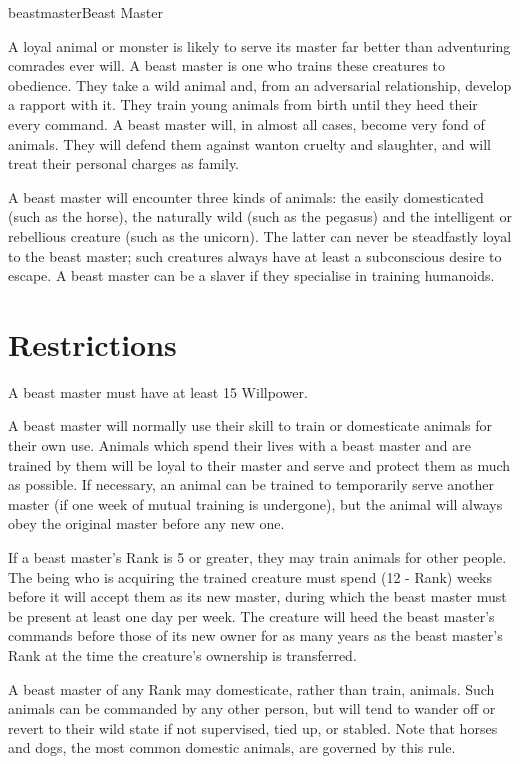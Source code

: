 \begin{Skill}[1.1]{beastmaster}{Beast Master}

A loyal animal or monster is likely to serve its master far better
than adventuring comrades ever will.  A beast master is one who trains
these creatures to obedience.  They take a wild animal and, from an
adversarial relationship, develop a rapport with it.  They train young
animals from birth until they heed their every command.  A beast
master will, in almost all cases, become very fond of animals.  They
will defend them against wanton cruelty and slaughter, and will treat
their personal charges as family.

A beast master will encounter three kinds of animals: the easily
domesticated (such as the horse), the naturally wild (such as the
pegasus) and the intelligent or rebellious creature (such as the
unicorn).  The latter can never be steadfastly loyal to the beast
master; such creatures always have at least a subconscious desire to
escape.  A beast master can be a slaver if they specialise in training
humanoids.

\section{Restrictions}

A beast master must have at least 15 Willpower. 

A beast master will normally use their skill to train or domesticate
animals for their own use. Animals which spend their lives with a
beast master and are trained by them will be loyal to their master and
serve and protect them as much as possible.  If necessary, an animal
can be trained to temporarily serve another master (if one week of
mutual training is undergone), but the animal will always obey the
original master before any new one.

If a beast master’s Rank is 5 or greater, they may train animals for
other people.  The being who is acquiring the trained creature must
spend (12 - Rank) weeks before it will accept them as its new master,
during which the beast master must be present at least one day per
week. The creature will heed the beast master’s commands before those
of its new owner for as many years as the beast master’s Rank at the
time the creature’s ownership is transferred.

A beast master of any Rank may domesticate, rather than train,
animals.  Such animals can be commanded by any other person, but will
tend to wander off or revert to their wild state if not supervised,
tied up, or stabled.  Note that horses and dogs, the most common
domestic animals, are governed by this rule.


\end{Skill}
